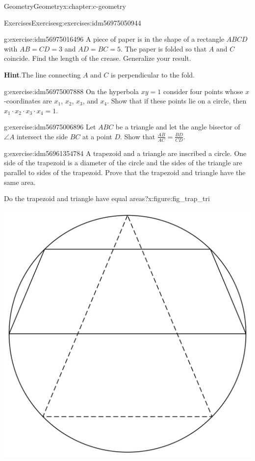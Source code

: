 \documentclass[twoside,10pt,]{book}
\newcommand{\blocktitlefont}{\relax}
\numberwithin{equation}{section}
\begin{document}
\begin{chapterptx}{Geometry}{}{Geometry}{}{}{x:chapter:c-geometry}
\begin{exercises-section}{Exercises}{}{Exercises}{}{}{g:exercises:idm56975050944}
\begin{divisionexercise}{6}{}{}{g:exercise:idm56975016496}%
A piece of paper is in the shape of a rectangle \(ABCD\) with \(AB=CD=3\) and \(AD=BC=5\). The paper is folded so that \(A\) and \(C\) coincide. Find the length of the crease.  Generalize your result.%
\par\smallskip%
\noindent\textbf{\blocktitlefont Hint}.\hypertarget{g:hint:idm56975011296}{}\quad{}The line connecting \(A\) and \(C\) is perpendicular to the fold.%
\end{divisionexercise}%
\begin{divisionexercise}{7}{}{}{g:exercise:idm56975007888}%
On the hyperbola \(x y = 1\) consider four points whose \(x\)-coordinates are \(x_1\), \(x_2\), \(x_3\), and \(x_4\). Show that if these points lie on a circle, then \(x_1 \cdot  x_{2} \cdot x_{3}\cdot x_4 = 1\).%
\end{divisionexercise}%
\begin{divisionexercise}{8}{}{}{g:exercise:idm56975006896}%
Let \(ABC\) be a triangle and let the angle bisector of \(\angle A\) intersect the side \(BC\) at a point \(D\). Show that \(\frac{A B}{A C} = \frac{B D}{C D}\).%
\end{divisionexercise}%
\begin{divisionexercise}{9}{}{}{g:exercise:idm56961354784}%
A trapezoid and a triangle are inscribed a circle. One side of the trapezoid is a diameter of the circle and the sides of the  triangle are parallel to sides of the trapezoid. Prove that the trapezoid and triangle have the same area.%
\begin{figureptx}{Do the trapezoid and triangle have equal areas?}{x:figure:fig_trap_tri}{}%
\begin{image}{0.2}{0.6}{0.2}%
\includegraphics[width=\linewidth]{images/fig_trap_tri.png}

\end{image}
\end{figureptx}
\end{divisionexercise}
\end{exercises-section}
\end{chapterptx}
\end{document}
